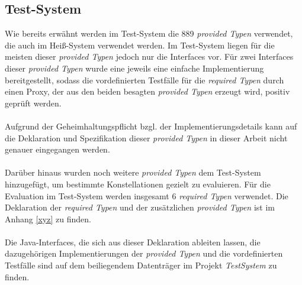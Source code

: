 \subsection{Test-System}
Wie bereits erwähnt werden im Test-System die 889 \emph{provided Typen} verwendet, die auch im Heiß-System verwendet werden. Im Test-System liegen für die meisten dieser \emph{provided Typen} jedoch nur die Interfaces vor. Für zwei Interfaces dieser \emph{provided Typen} wurde eine jeweils eine einfache Implementierung bereitgestellt, sodass die vordefinierten Testfälle für die \emph{required Typen} durch einen Proxy, der aus den beiden besagten \emph{provided Typen} erzeugt wird, positiv geprüft werden.
\\\\
Aufgrund der Geheimhaltungspflicht bzgl. der Implementierungsdetails kann auf die Deklaration und Spezifikation dieser \emph{provided Typen} in dieser Arbeit nicht genauer eingegangen werden.
\\\\
Darüber hinaus wurden noch weitere \emph{provided Typen} dem Test-System hinzugefügt, um bestimmte Konstellationen gezielt zu evaluieren. Für die Evaluation im Test-System werden insgesamt 6 \emph{required Typen} verwendet. Die Deklaration der \emph{required Typen} und der zusätzlichen \emph{provided Typen} ist im Anhang \ref{xyz} zu finden.  
\\\\
Die Java-Interfaces, die sich aus dieser Deklaration ableiten lassen, die dazugehörigen Implementierungen der \emph{provided Typen} und die vordefinierten Testfälle sind auf dem beiliegendem Datenträger im Projekt \emph{TestSystem} zu finden.
%
%
%
